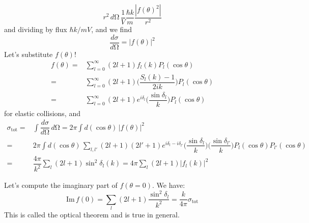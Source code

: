 \begin{rmk}
\[r^2\,d\mathrm{\Omega}\,\dfrac{1}{V}\dfrac{\hbar k}{m}\dfrac{|f(\theta )^2|}{r^2}\]
and dividing by flux $\hbar k/mV$, and we find
\[\dfrac{d\sigma }{d\mathrm{\Omega} }=|f(\theta )|^2\]
Let's substitute $f(\theta )$!
\[\begin{align*}
f(\theta )=&\sum ^{\infty }_{l=0}(2l+1)f_{l}(k)P_{l}(\cos \theta )\\
=&\sum _{l=0}^{\infty }(2l+1)\Big(\dfrac{S_{l}(k)-1}{2ik}\Big)P_{l}(\cos \theta )\\
=&\sum ^{\infty }_{l=0}(2l+1)e^{i\delta _{l}}\Big(\dfrac{\sin \delta _{l}}{k}\Big)P_{l}(\cos \theta )
\end{align*}\]
for elastic collisions, and
\[\begin{align*}
\sigma_{\mathrm{tot}}=&\int \dfrac{d\sigma }{d\mathrm{\Omega} }\,d\mathrm{\Omega} =2\pi \int d(\cos \theta )\,|f(\theta )|^2\\
=&2\pi \int d(\cos \theta )\,\sum _{l,l'}(2l+1)(2l'+1)e^{i\delta _{l}-i\delta _{l'}}\Big(\dfrac{\sin \delta _{l}}{k}\Big)\Big(\dfrac{\sin \delta _{l'}}{k}\Big)P_{l}(\cos \theta )P_{l'}(\cos \theta )\\
=&\dfrac{4\pi }{k^2} \sum _{l}(2l+1)\sin^2 \delta _{l}(k)=4\pi \sum _{l}(2l+1)|f_{l}(k)|^2
\end{align*}\]
\end{rmk}
\vspace{2ex}
\begin{cor}
Let's compute the imaginary part of $f(\theta =0)$. We have:
\[\mathrm{Im}\,f(0)=\sum _{l}(2l+1)\dfrac{\sin ^2\delta _{l}}{k^2}=\dfrac{k}{4\pi }\sigma _{\mathrm{tot}}\]
This is called the optical theorem and is true in general.
\end{cor}
\vspace{2ex}

